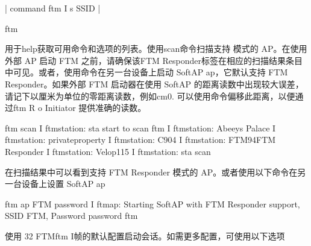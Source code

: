 \documentclass[a4paper,12pt,english]{sphinxmanual}
\begin{document}
{{\begin{sphinxVerbatim}[commandchars=\\\{\}]
 |     command \PYGZsq{}ftm \PYGZhy{}I \PYGZhy{}s \PYGZlt{}SSID\PYGZgt{}\PYGZsq{}                         |

ftm\PYGZgt{}
\end{sphinxVerbatim}

\sphinxAtStartPar
用于help获取可用命令和选项的列表。使用scan命令扫描支持  模式的 AP。在使用外部 AP 启动 FTM 之前，请确保该FTM Responder标签在相应的扫描结果条目中可见。或者，使用命令在另一台设备上启动 SoftAP ap，它默认支持 FTM Responder。如果外部 FTM 启动器在使用 SoftAP 的距离读数中出现较大误差，请记下以厘米为单位的零距离读数，例如cm0. 可以使用命令偏移此距离，以便通过ftm \sphinxhyphen{}R \sphinxhyphen{}o Initiator 提供准确的读数。

\begin{sphinxVerbatim}[commandchars=\\\{\}]
ftm\PYGZgt{} scan
I  ftm\PYGZus{}station: sta start to scan
ftm\PYGZgt{} I  ftm\PYGZus{}station: \PYG{o}{[}Abeeys Palace\PYG{o}{]}\PYG{o}{[}\PYG{o}{]}
I  ftm\PYGZus{}station: \PYG{o}{[}privateproperty\PYG{o}{]}\PYG{o}{[}\PYG{o}{]}
I  ftm\PYGZus{}station: \PYG{o}{[}C904\PYG{o}{]}\PYG{o}{[}\PYG{o}{]}
I  ftm\PYGZus{}station: \PYG{o}{[}FTM\PYG{o}{]}\PYG{o}{[}\PYGZhy{}94\PYG{o}{]}\PYG{o}{[}FTM Responder\PYG{o}{]}
I  ftm\PYGZus{}station: \PYG{o}{[}Velop\PYG{o}{]}\PYG{o}{[}\PYGZhy{}115\PYG{o}{]}
I  ftm\PYGZus{}station: sta scan 
\end{sphinxVerbatim}

\sphinxAtStartPar
在扫描结果中可以看到支持 FTM Responder 模式的 AP。或者使用以下命令在另一台设备上设置 SoftAP ap\sphinxhyphen{}

\begin{sphinxVerbatim}[commandchars=\\\{\}]
ftm\PYGZgt{} ap FTM password
I  ftm\PYGZus{}ap: Starting SoftAP with FTM Responder support, SSID \PYGZhy{} FTM, Password \PYGZhy{} password
ftm\PYGZgt{}
\end{sphinxVerbatim}

\sphinxAtStartPar
使用 32 FTMftm \sphinxhyphen{}I帧的默认配置启动会话。如需更多配置，可使用以下选项

}}
\end{document}
